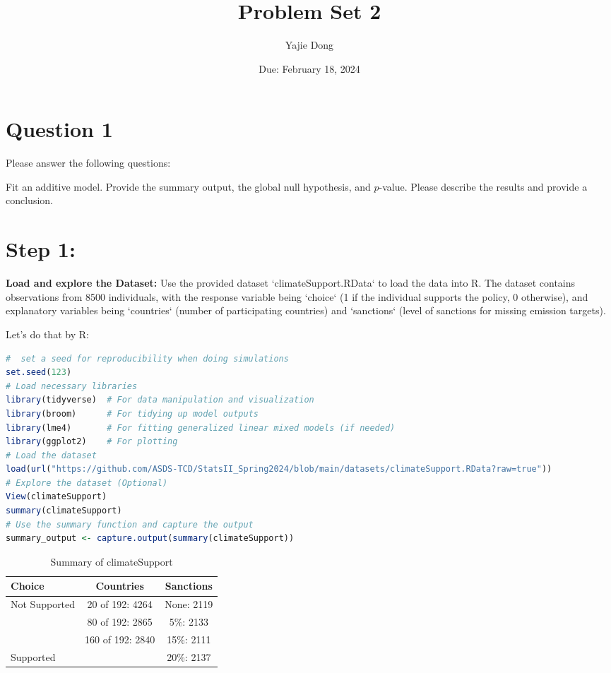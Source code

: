\documentclass[12pt,letterpaper]{article}
\title{Problem Set 2}
\date{Due: February 18, 2024}
\author{Yajie Dong}
\begin{document}
	\maketitle
	\section*{Question 1}

\noindent Please answer the following questions:

 
	 Fit an additive model. Provide the summary output, the global null hypothesis, and $p$-value. Please describe the results and provide a conclusion.

	\section*{Step 1:} \textbf{Load and explore the Dataset:} Use the provided dataset `climateSupport.RData` to load the data into R. The dataset contains observations from 8500 individuals, with the response variable being `choice` (1 if the individual supports the policy, 0 otherwise), and explanatory variables being `countries` (number of participating countries) and `sanctions` (level of sanctions for missing emission targets).

Let's do that by R:
\begin{lstlisting}[language=R]
#  set a seed for reproducibility when doing simulations
set.seed(123)
# Load necessary libraries
library(tidyverse)  # For data manipulation and visualization
library(broom)      # For tidying up model outputs
library(lme4)       # For fitting generalized linear mixed models (if needed)
library(ggplot2)    # For plotting
# Load the dataset
load(url("https://github.com/ASDS-TCD/StatsII_Spring2024/blob/main/datasets/climateSupport.RData?raw=true"))
# Explore the dataset (Optional)
View(climateSupport)
summary(climateSupport)
# Use the summary function and capture the output
summary_output <- capture.output(summary(climateSupport))
 \end{lstlisting}
\begin{table}[ht]
\centering
\begin{tabular}{@{}lcc@{}}
\toprule
Choice         & Countries                 & Sanctions \\ \midrule
Not Supported  & 20 of 192: 4264           & None: 2119 \\
               & 80 of 192: 2865           & 5\%: 2133 \\
               & 160 of 192: 2840          & 15\%: 2111 \\
Supported      &                           & 20\%: 2137 \\ \bottomrule
\end{tabular}
\caption{Summary of climateSupport}
\label{tab:climate-support}
\end{table}
\end{document}
